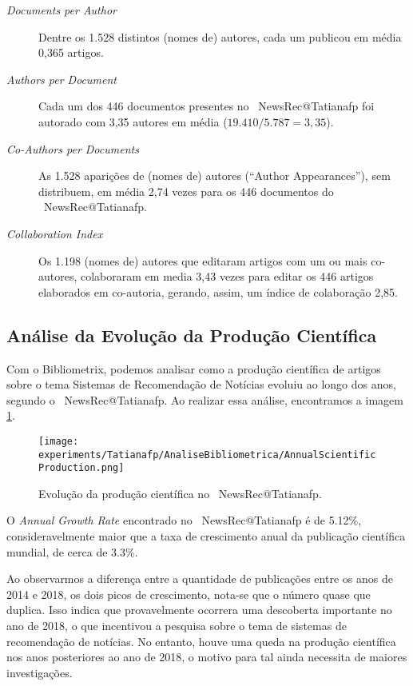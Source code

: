 \begin{description}
    \item [\textit{Documents per Author}] Dentre os 1.528 distintos (nomes de) autores, cada um publicou em média 0,365 artigos.
    \item [\textit{Authors per Document}] Cada um dos 446 documentos presentes no \dataset\   NewsRec@Tatianafp foi autorado com 3,35 autores em média ($19.410 / 5.787 = 3,35$).
    \item [\textit{Co-Authors per Documents}] As 1.528 aparições de (nomes de) autores (``Author Appearances''), sem distribuem, em média 2,74 vezes para os 446 documentos do \dataset\  NewsRec@Tatianafp.
    \item [\textit{Collaboration Index}] Os 1.198 (nomes de) autores que editaram artigos com um ou mais co-autores, colaboraram em media 3,43 vezes para editar os 446 artigos elaborados em co-autoria, gerando, assim, um índice de colaboração 2,85. 
\end{description}

\subsection{Análise da Evolução da Produção Científica}

Com o Bibliometrix, podemos analisar como a produção científica de artigos sobre o tema Sistemas de Recomendação de Notícias evoluiu ao longo dos anos, segundo o \dataset\  NewsRec@Tatianafp. Ao realizar essa análise, encontramos a imagem \ref{fig:evol_anual_NewsRec_Tatianafp}. 

\begin{figure}
    \centering
    \texttt{[image: experiments/Tatianafp/AnaliseBibliometrica/AnnualScientificProduction.png]}
    \caption{Evolução da produção científica no \dataset\  NewsRec@Tatianafp.}
    \label{fig:evol_anual_NewsRec_Tatianafp}
\end{figure}

O \textit{Annual Growth Rate} encontrado no \dataset\  NewsRec@Tatianafp é de 5.12\%, consideravelmente maior que a taxa de crescimento anual da publicação científica mundial, de cerca de 3.3\%.

Ao observarmos a diferença entre a quantidade de publicações entre os anos de 2014 e 2018, os dois picos de crescimento, nota-se que o número quase que duplica. Isso indica que provavelmente ocorrera uma descoberta importante no ano de 2018, o que incentivou a pesquisa sobre o tema de sistemas de recomendação de notícias. No entanto, houve uma queda na produção científica nos anos posteriores ao ano de 2018, o motivo para tal ainda necessita de maiores investigações.  



